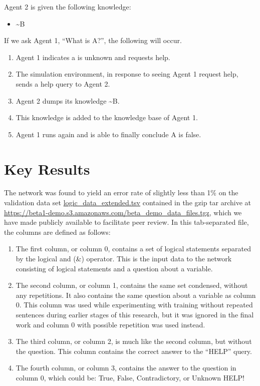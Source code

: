 \documentclass{article}
\begin{document}
Agent 2 is given the following knowledge:

\begin{itemize}
	\item \textasciitilde B
\end{itemize}

If we ask Agent 1, ``What is A?'', the following will occur.

\begin{enumerate}
	\item Agent 1 indicates a is unknown and requests help.
	\item The simulation environment, in response to seeing Agent 1 request help, sends a help query to Agent 2.
	\item Agent 2 dumps its knowledge \textasciitilde B.
	\item This knowledge is added to the knowledge base of Agent 1.
	\item Agent 1 runs again and is able to finally conclude A is false.
\end{enumerate}

\section{Key Results}

The network was found to yield an error rate of slightly less than 1\% on the validation data set \url{logic_data_extended.tsv} contained in the gzip tar archive at \url{https://beta1-demo.s3.amazonaws.com/beta_demo_data_files.tgz}, which we have made publicly available to facilitate peer review. In this tab-separated file, the columns are defined as follows:

\begin{enumerate}
	\item The first column, or column 0, contains a set of logical statements separated by the logical and (\&) operator. This is the input data to the network consisting of logical statements and a question about a variable.
	\item The second column, or column 1, contains the same set condensed, without any repetitions. It also contains the same question about a variable as column 0.  This column was used while experimenting with training without repeated sentences during earlier stages of this research, but it was ignored in the final work and column 0 with possible repetition 
		was used instead.
	\item The third column, or column 2, is much like the second column, but without the question.  This column contains
		the correct answer to the ``HELP'' query.
	\item The fourth column, or column 3, contains the answer to the question in column 0, which could be: True, False, Contradictory, or Unknown HELP!
\end{enumerate}
\end{document}
